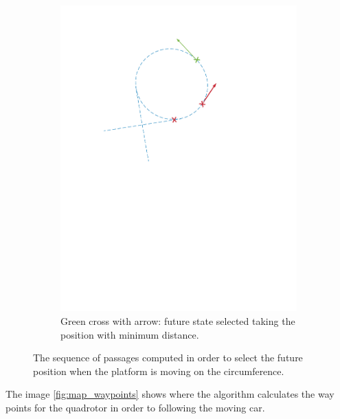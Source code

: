 \begin{itemize}
\begin{figure}[!htbp]
\begin{subfigure}[b]{0.45\textwidth}
        \includegraphics[width=\textwidth]{img/circular_movment8.pdf}
        \caption{Green cross with arrow: future state selected taking the position with minimum distance.}
        \label{fig:eight}
   \end{subfigure}
  \caption{The sequence of passages computed in order to select the future position when the platform is moving on the circumference.}
  \label{fig:sequence_find_next_position_circumference}
\end{figure} 
\end{itemize}
The image \ref{fig:map_waypoints} shows where the algorithm calculates the way points for the quadrotor in order to following the moving car.

